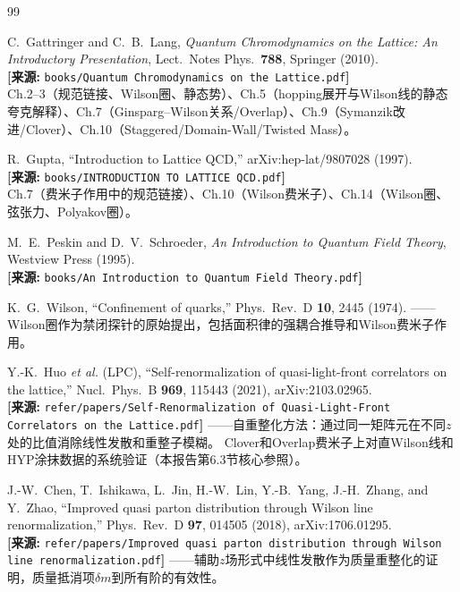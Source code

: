 \documentclass[12pt,a4paper]{ctexart}
\theoremstyle{definition}
\begin{document}
\begin{thebibliography}{99}

C.~Gattringer and C.~B.~Lang,
\textit{Quantum Chromodynamics on the Lattice: An Introductory Presentation},
Lect.\ Notes Phys.\ \textbf{788}, Springer (2010).
\\\textbf{[来源:} \texttt{books/Quantum Chromodynamics on the Lattice.pdf}\textbf{]}
\\Ch.2--3（规范链接、Wilson圈、静态势）、Ch.5（hopping展开与Wilson线的静态夸克解释）、Ch.7（Ginsparg--Wilson关系/Overlap）、Ch.9（Symanzik改进/Clover）、Ch.10（Staggered/Domain-Wall/Twisted Mass）。

R.~Gupta,
``Introduction to Lattice QCD,''
arXiv:hep-lat/9807028 (1997).
\\\textbf{[来源:} \texttt{books/INTRODUCTION TO LATTICE QCD.pdf}\textbf{]}
\\Ch.7（费米子作用中的规范链接）、Ch.10（Wilson费米子）、Ch.14（Wilson圈、弦张力、Polyakov圈）。

M.~E.~Peskin and D.~V.~Schroeder,
\textit{An Introduction to Quantum Field Theory},
Westview Press (1995).
\\\textbf{[来源:} \texttt{books/An Introduction to Quantum Field Theory.pdf}\textbf{]}

K.~G.~Wilson,
``Confinement of quarks,''
Phys.\ Rev.\ D \textbf{10}, 2445 (1974).
——Wilson圈作为禁闭探针的原始提出，包括面积律的强耦合推导和Wilson费米子作用。

Y.-K.~Huo \textit{et al.} (LPC),
``Self-renormalization of quasi-light-front correlators on the lattice,''
Nucl.\ Phys.\ B \textbf{969}, 115443 (2021), arXiv:2103.02965.
\\\textbf{[来源:} \texttt{refer/papers/Self-Renormalization of Quasi-Light-Front Correlators on the Lattice.pdf}\textbf{]}
——自重整化方法：通过同一矩阵元在不同$z$处的比值消除线性发散和重整子模糊。
Clover和Overlap费米子上对直Wilson线和HYP涂抹数据的系统验证（本报告第6.3节核心参照）。

J.-W.~Chen, T.~Ishikawa, L.~Jin, H.-W.~Lin, Y.-B.~Yang, J.-H.~Zhang, and Y.~Zhao,
``Improved quasi parton distribution through Wilson line renormalization,''
Phys.\ Rev.\ D \textbf{97}, 014505 (2018), arXiv:1706.01295.
\\\textbf{[来源:} \texttt{refer/papers/Improved quasi parton distribution through Wilson line renormalization.pdf}\textbf{]}
——辅助$z$场形式中线性发散作为质量重整化的证明，质量抵消项$\delta m$到所有阶的有效性。


\end{thebibliography}
\end{document}
